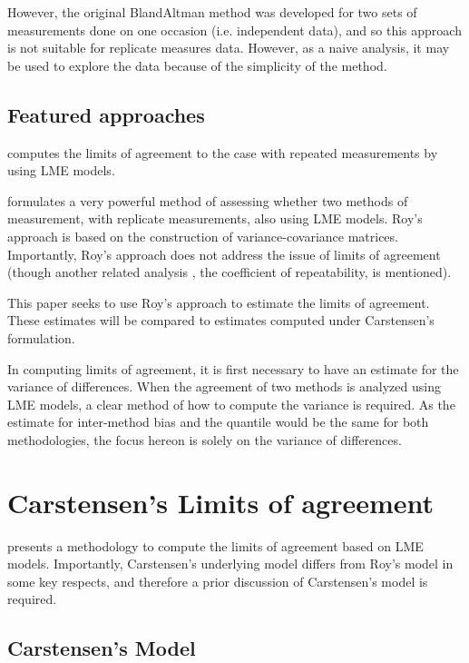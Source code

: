 \documentclass[12pt, a4paper]{report}
\theoremstyle{plain}
\theoremstyle{definition}
\theoremstyle{remark}
\begin{document}
			However, the original BlandAltman method was developed for two sets of measurements done on one occasion (i.e. independent data), and so this approach is not suitable for replicate measures data. However, as a naive analysis, it may be used to explore the data because of the simplicity of the method.
			
			\subsection{Featured approaches}
			
			\citet{BXC2008} computes the limits of agreement to the case with repeated measurements by using LME models.
			
			\citet{ARoy2009} formulates a very powerful method of assessing whether two methods of measurement, with replicate measurements, also using LME models. Roy's approach is based on the construction of variance-covariance matrices.
			Importantly, Roy's approach does not address the issue of limits of agreement (though another related analysis , the coefficient of repeatability, is mentioned).
			
			This paper seeks to use Roy's approach to estimate the limits of agreement. These estimates will be compared to estimates computed under Carstensen's formulation.
			
			In computing limits of agreement, it is first necessary to have an estimate for the variance of differences. When the agreement of two methods is analyzed using LME models, a clear method of how to compute the variance is required. As the estimate for inter-method bias and the quantile would be the same for both methodologies, the focus hereon is solely on the variance of differences.
			
			\newpage
			
\section{Carstensen's Limits of agreement}
\citet{bxc2008} presents a methodology to compute the limits of
agreement based on LME models. Importantly, Carstensen's underlying model differs from Roy's model in some key respects, and therefore a prior discussion of Carstensen's model is required.

\subsection{Carstensen's Model}
\end{document}
